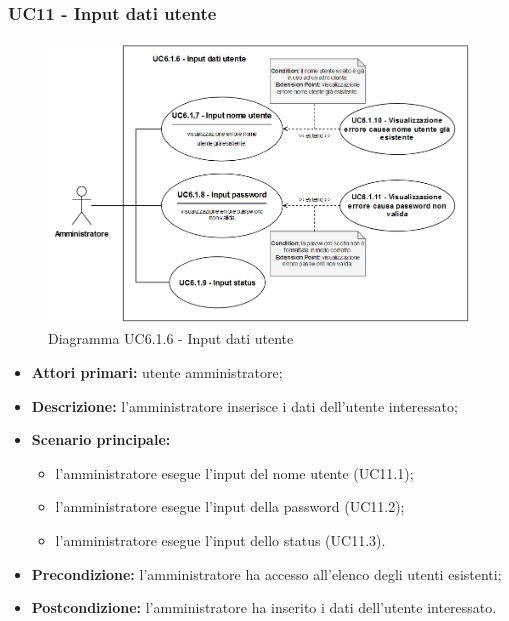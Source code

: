 \subsubsection{UC11 - Input dati utente}
	\begin{figure}[H]
		\centering
		\includegraphics[width=15cm]{images/UC6.1.6.png}
		\caption{Diagramma UC6.1.6 - Input dati utente}
	\end{figure}
	\begin{itemize}
		\item \textbf{Attori primari:} utente amministratore;
		\item \textbf{Descrizione:} l'amministratore inserisce i dati dell'utente interessato;
		\item \textbf{Scenario principale:} 
			\begin{itemize}
				\item l'amministratore esegue l'input del nome utente (UC11.1);
				\item l'amministratore esegue l'input della password (UC11.2);
				\item l'amministratore esegue l'input dello status (UC11.3).
			\end{itemize}
		\item \textbf{Precondizione:} l'amministratore ha accesso all'elenco degli utenti esistenti;
		\item \textbf{Postcondizione:} l'amministratore ha inserito i dati dell'utente interessato.
	\end{itemize}

